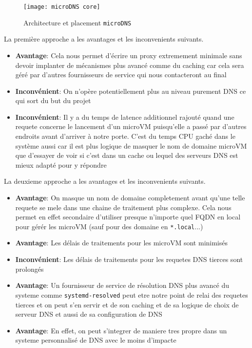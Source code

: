 \documentclass[12pt]{article}
\begin{document}
\begin{figure}[H]
	\centering
	\texttt{[image: microDNS core]}
	\caption{Architecture et placement \texttt{microDNS}}
	\label{microDNS:corearch}
\end{figure}

La première approche a les avantages et les inconvenients suivants.
\begin{itemize}
	\item \textbf{Avantage}: Cela nous permet d'écrire un proxy extremement minimale sans devoir implanter de mécanismes plus avancé comme du caching car cela sera géré par d'autres fournisseurs de service qui nous contacteront au final
	\item \textbf{Inconvénient}: On n'opère potentiellement plus au niveau purement DNS ce qui sort du but du projet
	\item \textbf{Inconvénient}: Il y a du temps de latence additionnel rajouté quand une requete concerne le lancement d'un microVM puisqu'elle a passé par d'autres endroits avant d'arriver à notre porte. C'est du temps CPU gaché dans le système aussi car il est plus logique de masquer le nom de domaine microVM que d'essayer de voir si c'est dans un cache ou lequel des serveurs DNS est mieux adapté pour y répondre
\end{itemize}

La deuxieme approche a les avantages et les inconvenients suivants.
\begin{itemize}
	\item \textbf{Avantage}: On masque un nom de domaine completement avant qu'une telle requete se mele dans une chaine de traitement plus complexe. Cela nous permet en effet secondaire d'utiliser presque n'importe quel FQDN en local pour gérér les microVM (sauf pour des domaine en \texttt{*.local}...)
	\item \textbf{Avantage}: Les délais de traitements pour les microVM sont minimisés
	\item \textbf{Inconvénient}: Les délais de traitements pour les requetes DNS tierces sont prolongés
	\item \textbf{Avantage}: Un fournisseur de service de résolution DNS plus avancé du systeme comme \texttt{systemd-resolved} peut etre notre point de relai des requetes tierces et on peut s'en servir et de son caching et de sa logique de choix de serveur DNS et aussi de sa configuration de DNS
	\item \textbf{Avantage}: En effet, on peut s'integrer de maniere tres propre dans un systeme personnalisé de DNS avec le moins d'impacte
\end{itemize}
\end{document}
